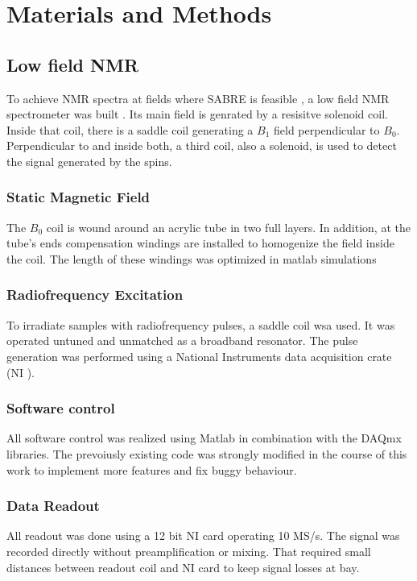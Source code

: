 \chapter{Materials and Methods}\label{chap:MaterialsAndMethods}
	\section{Low field NMR}
		To achieve NMR spectra at fields where SABRE is feasible , a low field NMR
		spectrometer was built . Its main field is genrated by a resisitve solenoid
		coil. Inside that coil, there is a saddle coil
		generating a $B_1$ field perpendicular to $B_0$. Perpendicular to and inside both, a third
		coil, also a solenoid, is used to detect the signal generated by the spins.
		\subsection{Static Magnetic Field}
			The $B_0$ coil is wound around an acrylic tube in two full layers. In addition, at the
			tube's ends compensation windings are installed to homogenize the field inside the coil.
			The length of these windings was optimized in matlab simulations 
		\subsection{Radiofrequency Excitation}
			To irradiate samples with radiofrequency pulses, a saddle coil  wsa
			used. It was operated untuned and unmatched as a broadband resonator. The pulse
			generation was performed using a National Instruments data acquisition crate (NI
			). 
		\subsection{Software control}
			All software control was realized using Matlab in combination with the DAQmx libraries.
			The prevoiusly existing code was strongly modified in the course of this work to
			implement more features and fix buggy behaviour.
		\subsection{Data Readout}
			All readout was done using a 12 bit NI  card operating 10 MS/s. The signal
			was recorded directly without preamplification or mixing. That required small distances
			between readout coil and NI card to keep signal losses at bay. 
